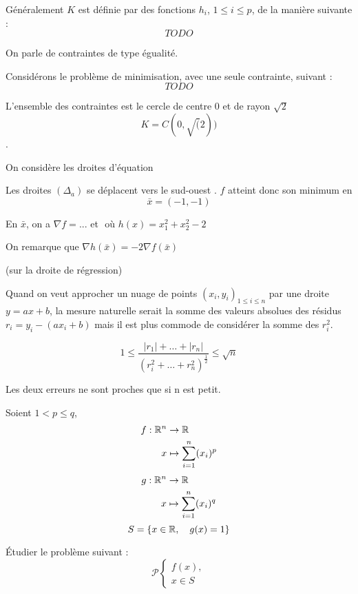 
Généralement $K$ est définie par des fonctions $h_i$, $1 \leq i \leq p$, de la manière suivante : \[ TODO \]

On parle de contraintes de type égualité.


\begin{exemple}
	Considérons le problème de minimisation, avec une seule contrainte, suivant : \[ TODO \]	
	
	L'ensemble des contraintes est le cercle de centre 0 et de rayon $\sqrt 2$ \[ K = C(0, \sqrt(2)) \].
	
	On considère les droites d'équation \[  \]
	
	Les droites $(\Delta_a)$ se déplacent vers le \og sud-ouest \fg. $f$ atteint donc son minimum en \[ \bar{x} = (-1, -1) \]
	
	En $\bar{x}$, on a $\displaystyle \nabla f = ...$ et $ $ où $h(x) = x_1^2 + x_2^2 - 2$
	
	On remarque que $ \nabla h( \bar{x} ) = -2  \nabla f( \bar{x} ) $
	
	
\end{exemple}


\begin{remarque} (sur la droite de régression)

	Quand on veut approcher un nuage de points $(x_i, y_i)_{1 \leq i \leq n}$ par une droite $y = ax +b$, la mesure naturelle serait la somme des valeurs absolues des résidus $r_i = y_i -(ax_i+b)$ mais il est plus commode de considérer la somme des $r_i^2$.

	\[ 1 \leq \frac{ |r_1| + \dots + |r_n| }{ (r_i^2 + \dots + r_n^2)^{\frac{1}{2}} } \leq \sqrt{n} \]
	
	Les deux erreurs ne sont proches que si n est petit.
\end{remarque}

\begin{exemple}
	Soient $1 < p \leq q$,
	\begin{align*}
	f : \mathbb{R}^n & \rightarrow  \mathbb{R} \\
	x & \mapsto \sum_{i=1}^n (x_i)^p
	\end{align*}
	\begin{align*}
	g : \mathbb{R}^n & \rightarrow  \mathbb{R} \\
	x & \mapsto \sum_{i=1}^n (x_i)^q
	\end{align*}
	\[ S = \{ x \in \mathbb{R}, \quad g(x) = 1 \} \]
	
	Étudier le problème suivant :
	\[ \mathcal{P} \begin{cases} f(x), \\ x \in S \end{cases} \]
	
	
\end{exemple}

